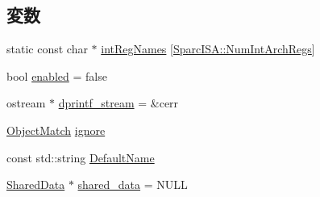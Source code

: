 \subsection*{変数}
\begin{DoxyCompactItemize}
\item 
static const char $\ast$ \hyperlink{namespaceTrace_a4b9af3ca9339fc3f7d523eb06a2c1d40}{intRegNames} \mbox{[}\hyperlink{namespaceSparcISA_a405c0abe85dc0da846c120e3b31f375c}{SparcISA::NumIntArchRegs}\mbox{]}
\item 
bool \hyperlink{namespaceTrace_a8740ba80e30dd75e71d09fa1dcf04f3d}{enabled} = false
\item 
ostream $\ast$ \hyperlink{namespaceTrace_abf77cc0b0db9664cef461fff6749ba72}{dprintf\_\-stream} = \&cerr
\item 
\hyperlink{classObjectMatch}{ObjectMatch} \hyperlink{namespaceTrace_a827db600690db919f77af4e28514a655}{ignore}
\item 
const std::string \hyperlink{namespaceTrace_a9e50643ecd3b22ed7ac6c78cfe9c267f}{DefaultName}
\item 
\hyperlink{structSharedData}{SharedData} $\ast$ \hyperlink{namespaceTrace_a5416904b225ef0514d8e5b146e5ffe71}{shared\_\-data} = NULL
\end{DoxyCompactItemize}


